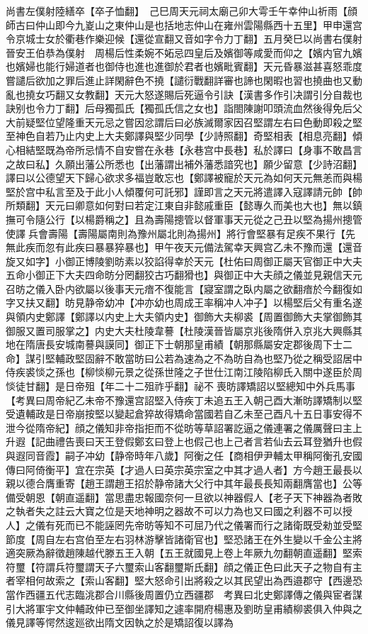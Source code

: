 尚書左僕射陸繕卒【卒子恤翻】　己巳周天元祠太廟己卯大雩壬午幸仲山祈雨【顔師古曰仲山即今九嵏山之東仲山是也括地志仲山在雍州雲陽縣西十五里】甲申還宫令京城士女於衢巷作樂迎候【還從宣翻又音如字令力丁翻】五月癸巳以尚書右僕射晉安王伯恭為僕射　周楊后性柔婉不妬忌四皇后及嬪御等咸愛而仰之【嬪内官九嬪也嬪婦也能行婦道者也御侍也進也進御於君者也嬪毗賓翻】天元昏暴滋甚喜怒乖度嘗譴后欲加之罪后進止詳閑辭色不撓【譴衍戰翻詳審也諦也閑暇也習也撓曲也又動亂也撓女巧翻又女教翻】天元大怒遂賜后死逼令引訣【漢書多作引决謂引分自裁也訣别也令力丁翻】后母獨孤氏【獨孤氏信之女也】詣閤陳謝叩頭流血然後得免后父大前疑堅位望隆重天元忌之嘗因忿謂后曰必族滅爾家因召堅謂左右曰色動即殺之堅至神色自若乃止内史上大夫鄭譯與堅少同學【少詩照翻】奇堅相表【相息亮翻】傾心相結堅既為帝所忌情不自安嘗在永巷【永巷宫中長巷】私於譯曰【身事不敢昌言之故曰私】久願出藩公所悉也【出藩謂出補外藩悉諳究也】願少留意【少詩沼翻】譯曰以公德望天下歸心欲求多福豈敢忘也【鄭譯被寵於天元為如何天元無恙而與楊堅於宫中私言至及于此小人傾覆何可託邪】謹即言之天元將遣譯入寇譯請元帥【帥所類翻】天元曰卿意如何對曰若定江東自非懿戚重臣【懿專久而美也大也】無以鎮撫可令隨公行【以楊爵稱之】且為壽陽摠管以督軍事天元從之己丑以堅為揚州摠管使譯兵會壽陽【壽陽屬南則為豫州屬北則為揚州】將行會堅暴有足疾不果行【先無此疾而忽有此疾曰暴暴猝暴也】甲午夜天元備法駕幸天興宫乙未不豫而還【還音旋又如字】小御正博陵劉昉素以狡諂得幸於天元【杜佑曰周御正屬天官御正中大夫五命小御正下大夫四命昉分罔翻狡古巧翻猾也】與御正中大夫顔之儀並見親信天元召昉之儀入卧内欲屬以後事天元瘖不復能言【寢室謂之臥内屬之欲翻瘖於今翻復如字又扶又翻】昉見静帝幼冲【冲亦幼也周成王率稱冲人冲子】以楊堅后父有重名遂與領内史鄭譯【鄭譯以内史上大夫領内史】御飾大夫柳裘【周置御飾大夫掌御飾其御服又置司服掌之】内史大夫杜陵韋謩【杜陵漢晉皆屬京兆後隋併入京兆大興縣其地在隋唐長安城南謩與謨同】御正下士朝那皇甫績【朝那縣屬安定郡後周下士二命】謀引堅輔政堅固辭不敢當昉曰公若為速為之不為昉自為也堅乃從之稱受詔居中侍疾裘惔之孫也【柳惔柳元景之從孫世隆之子世仕江南江陵陷柳氏入關中遂臣於周惔徒甘翻】是日帝殂【年二十二殂祚乎翻】祕不喪昉譯矯詔以堅總知中外兵馬事　【考異曰周帝紀乙未帝不豫還宫詔堅入侍疾丁未追五王入朝己酉大漸昉譯矯制以堅受遺輔政是日帝崩按堅以變起倉猝故得矯命當國若自乙未至己酉凡十五日事安得不泄今從隋帝紀】顔之儀知非帝指拒而不從昉等草詔署訖逼之儀連署之儀厲聲曰主上升遐【記曲禮告喪曰天王登假鄭玄曰登上也假己也上己者言若仙去云耳登猶升也假與遐同音霞】嗣子冲幼【静帝時年八歲】阿衡之任【商相伊尹輔太甲稱阿衡孔安國傳曰阿倚衡平】宜在宗英【才過人曰英宗英宗室之中其才過人者】方今趙王最長以親以德合膺重寄【趙王謂趙王招於静帝諸大父行中其年最長長知兩翻膺當也】公等備受朝恩【朝直遥翻】當思盡忠報國奈何一旦欲以神器假人【老子天下神器為者敗之執者失之註云大寶之位是天地神明之器故不可以力為也又曰國之利器不可以授人】之儀有死而已不能誣罔先帝昉等知不可屈乃代之儀署而行之諸衛既受勑並受堅節度【周自左右宫伯至左右羽林游擊皆諸衛官也】堅恐諸王在外生變以千金公主將適突厥為辭徵趙陳越代滕五王入朝【五王就國見上卷上年厥九勿翻朝直遥翻】堅索符璽【符謂兵符璽謂天子六璽索山客翻璽斯氏翻】顔之儀正色曰此天子之物自有主者宰相何故索之【索山客翻】堅大怒命引出將殺之以其民望出為西邉郡守【西邊恐當作西疆五代志臨洮郡合川縣後周置仍立西疆郡　考異曰北史鄭譯傳之儀與宦者謀引大將軍宇文仲輔政仲已至御坐譯知之遽率開府楊惠及劉昉皇甫績柳裘俱入仲與之儀見譯等愕然逡廵欲出隋文因執之於是矯詔復以譯為